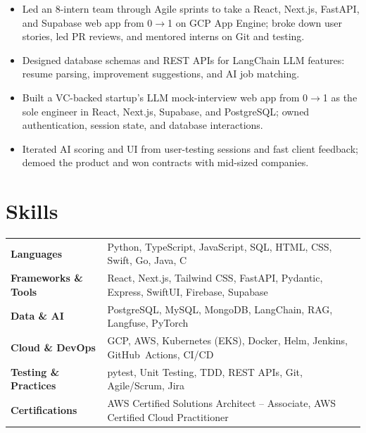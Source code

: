 \documentclass[11pt, letterpaper]{article}
\begin{document}
\vspace{1pt}
\begin{itemize}
  \item Led an 8-intern team through Agile sprints to take a React, Next.js, FastAPI, and Supabase web app from 0$\to$1 on GCP App Engine; broke down user stories, led PR reviews, and mentored interns on Git and testing.
  \item Designed database schemas and REST APIs for LangChain LLM features: resume parsing, improvement suggestions, and AI job matching.
\end{itemize}

\vspace{1pt}
\begin{itemize}
  \item Built a VC-backed startup's LLM mock-interview web app from 0$\to$1 as the sole engineer in React, Next.js, Supabase, and PostgreSQL; owned authentication, session state, and database interactions.
  \item Iterated AI scoring and UI from user-testing sessions and fast client feedback; demoed the product and won contracts with mid-sized companies.
\end{itemize}

\section{Skills}
\begin{tabularx}{\textwidth}{@{}l @{\hspace{7pt}} >{\raggedright\arraybackslash}X@{}}
  \textbf{Languages} & Python, TypeScript, JavaScript, SQL, HTML, CSS, Swift, Go, Java, C \\[1pt]
  \textbf{Frameworks \& Tools} & React, Next.js, Tailwind CSS, FastAPI, Pydantic, Express, SwiftUI, Firebase, Supabase \\[1pt]
  \textbf{Data \& AI} & PostgreSQL, MySQL, MongoDB, LangChain, RAG, Langfuse, PyTorch \\[1pt]
  \textbf{Cloud \& DevOps} & GCP, AWS, Kubernetes (EKS), Docker, Helm, Jenkins, GitHub~Actions, CI/CD \\[1pt]
  \textbf{Testing \& Practices} & pytest, Unit Testing, TDD, REST APIs, Git, Agile/Scrum, Jira \\[1pt]
  \textbf{Certifications} & AWS Certified Solutions Architect -- Associate, AWS Certified Cloud Practitioner \\
\end{tabularx}
\end{document}

